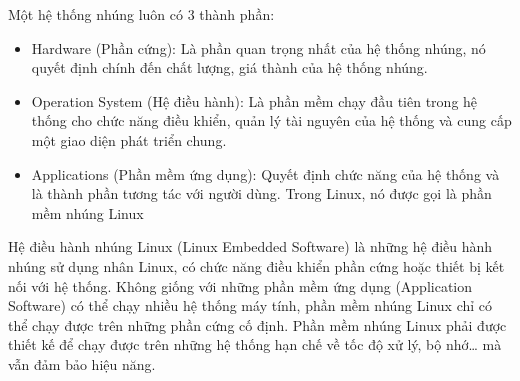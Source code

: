 Một hệ thống nhúng luôn có 3 thành phần:
\begin{itemize}
	\item Hardware (Phần cứng): Là phần quan trọng nhất của hệ thống nhúng, nó quyết định chính đến chất lượng, giá thành của hệ thống nhúng.
	\item Operation System (Hệ điều hành): Là phần mềm chạy đầu tiên trong hệ thống cho chức năng điều khiển, quản lý tài nguyên của hệ thống và cung cấp một giao diện phát triển chung.
	\item Applications (Phần mềm ứng dụng): Quyết định chức năng của hệ thống và là thành phần tương tác với người dùng. Trong Linux, nó được gọi là phần mềm nhúng Linux
\end{itemize}

Hệ điều hành nhúng Linux (Linux Embedded Software) là những hệ điều hành nhúng sử dụng nhân Linux, có chức năng điều khiển phần cứng hoặc thiết bị kết nối với hệ thống. Không giống với những phần mềm ứng dụng (Application Software) có thể chạy nhiều hệ thống máy tính, phần mềm nhúng Linux chỉ có thể chạy được trên những phần cứng cố định. Phần mềm nhúng Linux phải được thiết kế để chạy được trên những hệ thống hạn chế về tốc độ xử lý, bộ nhớ… mà vẫn đảm bảo hiệu năng.
